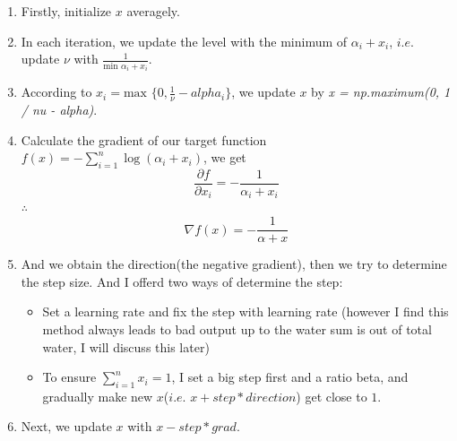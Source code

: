\documentclass[12pt, a4paper, oneside]{article}
\begin{document}
\begin{enumerate}
    \item Firstly, initialize $x$ averagely.
    \item In each iteration, we update the level with the minimum of $\alpha_i + x_i$, $i.e.$ update $\nu$ with $\frac{1}{\mbox{min }\alpha_i + x_i}$.
    \item According to $x_i = \mbox{max }\{0, \frac{1}{\nu} - alpha_i\}$, we update $x$ by \textit{x = np.maximum(0, 1 / nu - alpha)}.
    \item 
    {
        Calculate the gradient of our target function $f(x) = -\sum_{i=1}^{n}\log{(\alpha_i + x_i)}$, we get
        \begin{displaymath}
            \frac{\partial f}{\partial x_i} = -\frac{1}{\alpha_i + x_i}
        \end{displaymath}
        $\therefore$
        \begin{displaymath}
            \nabla f(x) = - \frac{1}{\alpha + x}
        \end{displaymath}
    }
    \item 
    {
        And we obtain the direction(the negative gradient), then we try to determine the step size. And I offerd two ways of determine the step:
        \begin{itemize}
            \item Set a learning rate and fix the step with learning rate (however I find this method always leads to bad output up to the water sum is out of total water, I will discuss this later)
            \item To ensure $\sum_{i=1}^{n}x_i = 1$, I set a big step first and a ratio beta, and gradually make new $x$($i.e.$ $x + step * direction$) get close to $1$. 
        \end{itemize}
    }
    \item Next, we update $x$ with $x - step * grad$.
\end{enumerate}
\end{document}
